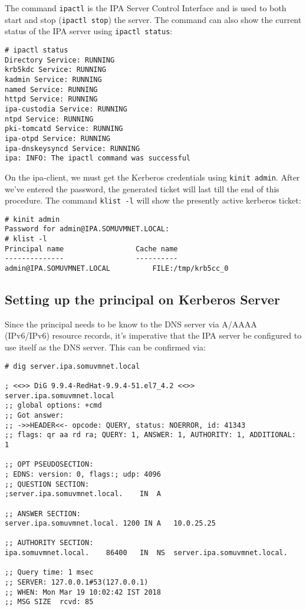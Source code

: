 \noindent
The command \verb|ipactl| is the IPA Server Control Interface and is used to both start and stop (\verb|ipactl stop|) the server. The command can also show the current status of the IPA server using \verb|ipactl status|:

\vspace{-15pt}
\begin{verbatim}
# ipactl status
Directory Service: RUNNING
krb5kdc Service: RUNNING
kadmin Service: RUNNING
named Service: RUNNING
httpd Service: RUNNING
ipa-custodia Service: RUNNING
ntpd Service: RUNNING
pki-tomcatd Service: RUNNING
ipa-otpd Service: RUNNING
ipa-dnskeysyncd Service: RUNNING
ipa: INFO: The ipactl command was successful
\end{verbatim}
\vspace{-10pt}	

\noindent
On the ipa-client, we must get the Kerberos credentials using \verb|kinit admin|. After we've entered the password, the generated ticket will last till the end of this procedure. The command \verb|klist -l|	will show the presently active kerberos ticket:

\vspace{-15pt}
\begin{verbatim}
# kinit admin
Password for admin@IPA.SOMUVMNET.LOCAL: 
# klist -l
Principal name                 Cache name
--------------                 ----------
admin@IPA.SOMUVMNET.LOCAL          FILE:/tmp/krb5cc_0
\end{verbatim}
\vspace{-10pt}	

\subsection{Setting up the principal on Kerberos Server}
Since the principal needs to be know to the DNS server via A/AAAA (IPv6/IPv6) resource records, it's imperative that the IPA server be configured to use itself as the DNS server. This can be confirmed via:

\vspace{-15pt}
\begin{verbatim}
# dig server.ipa.somuvmnet.local

; <<>> DiG 9.9.4-RedHat-9.9.4-51.el7_4.2 <<>> server.ipa.somuvmnet.local
;; global options: +cmd
;; Got answer:
;; ->>HEADER<<- opcode: QUERY, status: NOERROR, id: 41343
;; flags: qr aa rd ra; QUERY: 1, ANSWER: 1, AUTHORITY: 1, ADDITIONAL: 1

;; OPT PSEUDOSECTION:
; EDNS: version: 0, flags:; udp: 4096
;; QUESTION SECTION:
;server.ipa.somuvmnet.local.	IN	A

;; ANSWER SECTION:
server.ipa.somuvmnet.local. 1200 IN	A	10.0.25.25

;; AUTHORITY SECTION:
ipa.somuvmnet.local.	86400	IN	NS	server.ipa.somuvmnet.local.

;; Query time: 1 msec
;; SERVER: 127.0.0.1#53(127.0.0.1)
;; WHEN: Mon Mar 19 10:02:42 IST 2018
;; MSG SIZE  rcvd: 85
\end{verbatim}
\vspace{-10pt}	

